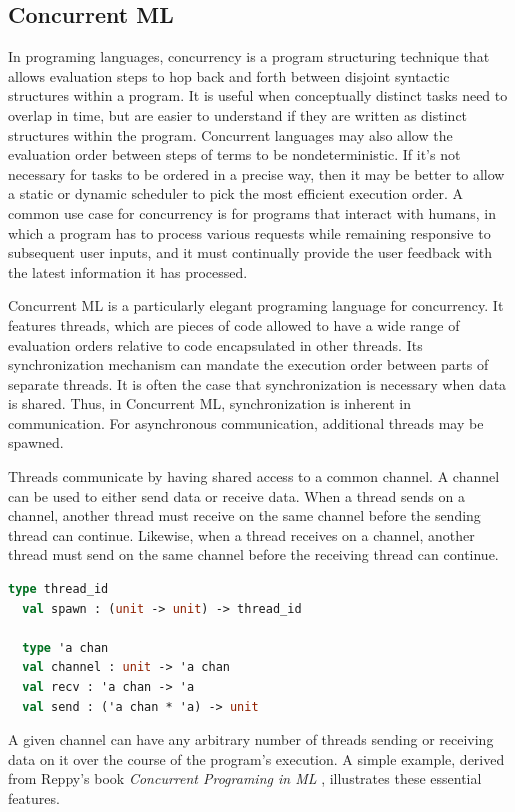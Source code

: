 \documentclass[letterpaper, 11pt]{extarticle}
\begin{document}
\subsection{Concurrent ML}
In programing languages, concurrency is a program structuring technique that allows evaluation
steps to hop back and forth between disjoint syntactic structures within a program.
It is useful
when conceptually distinct tasks need to overlap in time, but are easier to understand if they
are written as distinct structures within the program. Concurrent languages may also allow the
evaluation order between steps of terms to be nondeterministic. If it's not necessary for
tasks to be ordered in a precise way, then it may be better to allow a static or dynamic
scheduler to pick the most efficient execution order. A common use case for concurrency
is for programs that interact with humans, in which a program has to process various requests
while remaining responsive to subsequent user inputs, and it must continually provide the user
feedback with the latest information it has processed.

Concurrent ML is a particularly elegant programing language for concurrency.
It features threads, which are pieces of code allowed to have a wide range of
evaluation orders relative to code encapsulated in other threads. Its synchronization
mechanism can mandate the execution order between parts of separate threads. It is often the
case that synchronization is necessary when data is shared. Thus, in Concurrent ML,
synchronization is inherent in communication. For asynchronous communication, additional threads may be spawned.

Threads communicate by having shared access to a common channel. A channel can be used to
either send data or receive data. When a thread sends on a channel, another thread must
receive on the same channel before the sending thread can continue. Likewise, when a thread
receives on a channel, another thread must send on the same channel before the receiving thread
can continue.

\begin{lstlisting}[language=ML]
  type thread_id
  val spawn : (unit -> unit) -> thread_id

  type 'a chan
  val channel : unit -> 'a chan
  val recv : 'a chan -> 'a
  val send : ('a chan * 'a) -> unit
  \end{lstlisting}

A given channel can have any arbitrary number of threads sending or receiving data on it over
the course of the program's execution. A simple example, derived from Reppy's book
\textit{Concurrent Programing in ML} \cite{reppy2007concurrent}, illustrates these essential
features.
\end{document}
